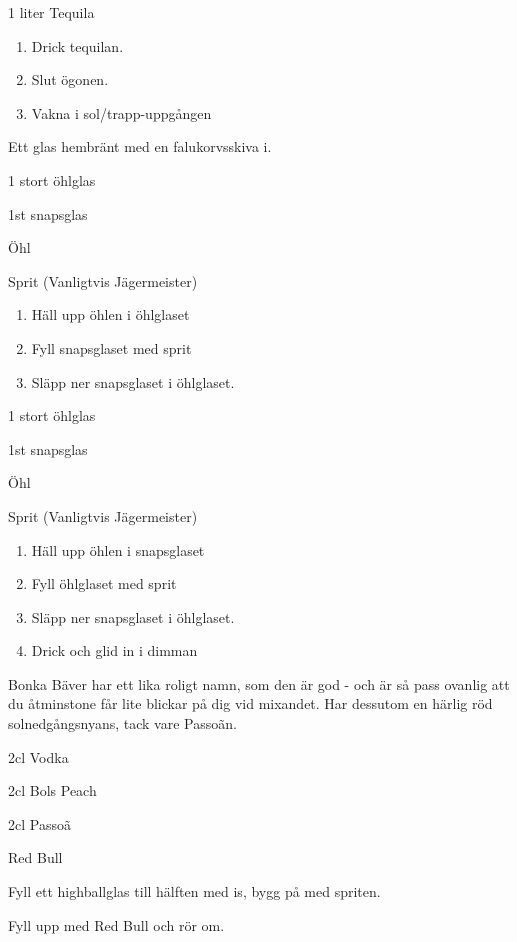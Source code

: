 1 liter Tequila

\begin{enumerate}
    \item Drick tequilan.
    \item Slut ögonen.
    \item Vakna i sol/trapp-uppgången
\end{enumerate}


\filbreak
{}

Ett glas hembränt med en falukorvsskiva i.
\filbreak
{}

1 stort öhlglas

1st snapsglas

Öhl

Sprit (Vanligtvis Jägermeister)

\begin{enumerate}
    \item Häll upp öhlen i öhlglaset
    \item Fyll snapsglaset med sprit
    \item Släpp ner snapsglaset i öhlglaset.
\end{enumerate}

\filbreak
{}

1 stort öhlglas

1st snapsglas

Öhl

Sprit (Vanligtvis Jägermeister)

\begin{enumerate}
    \item Häll upp öhlen i snapsglaset
    \item Fyll öhlglaset med sprit
    \item Släpp ner snapsglaset i öhlglaset.
    \item Drick och glid in i dimman
\end{enumerate}
\filbreak
{}

Bonka Bäver har ett lika roligt namn, som den är god - och är så pass ovanlig att du åtminstone får lite blickar på dig vid mixandet. Har dessutom en härlig röd solnedgångsnyans, tack vare Passoãn.

2cl Vodka

2cl Bols Peach

2cl Passoã

Red Bull

Fyll ett highballglas till hälften med is, bygg på med spriten.

Fyll upp med Red Bull och rör om.

\newpage